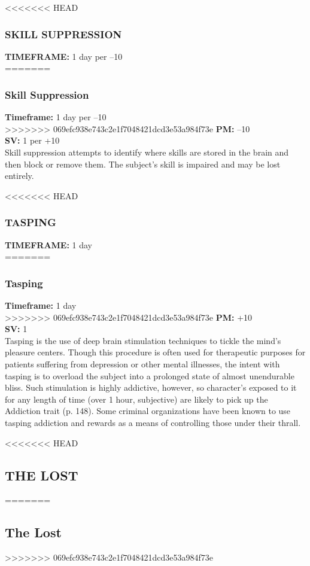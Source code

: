 <<<<<<< HEAD
\subsubsection{SKILL SUPPRESSION}
\textbf{TIMEFRAME:} 1 day per –10 \\
=======
\subsubsection{Skill Suppression}
\textbf{Timeframe:} 1 day per –10 \\
>>>>>>> 069efc938e743c2e1f7048421dcd3e53a984f73e
\textbf{PM:} –10 \\
\textbf{SV:} 1 per +10 \\
Skill suppression attempts to identify where skills are
stored in the brain and then block or remove them.
The subject’s skill is impaired and may be lost entirely.

<<<<<<< HEAD
\subsubsection{TASPING}
\textbf{TIMEFRAME:} 1 day \\
=======
\subsubsection{Tasping}
\textbf{Timeframe:} 1 day \\
>>>>>>> 069efc938e743c2e1f7048421dcd3e53a984f73e
\textbf{PM:} +10 \\
\textbf{SV:} 1 \\
Tasping is the use of deep brain stimulation techniques
to tickle the mind’s pleasure centers. Though this
procedure is often used for therapeutic purposes for
patients suffering from depression or other mental
illnesses, the intent with tasping is to overload the
subject into a prolonged state of almost unendurable
bliss. Such stimulation is highly addictive, however, so
character’s exposed to it for any length of time (over
1 hour, subjective) are likely to pick up the Addiction
trait (p. 148). Some criminal organizations have been
known to use tasping addiction and rewards as a
means of controlling those under their thrall.


<<<<<<< HEAD
\subsection{THE LOST}
=======
\subsection{The Lost}
>>>>>>> 069efc938e743c2e1f7048421dcd3e53a984f73e

